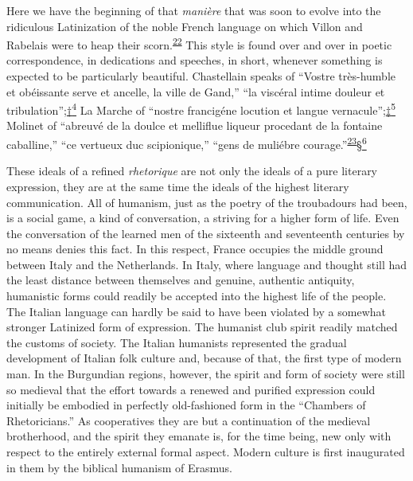 Here we have the beginning of that \emph{manière} that was soon to
evolve into the ridiculous Latinization of the noble French language on
which Villon and Rabelais were to heap their
scorn.\textsuperscript{\protect\hypertarget{22_Chapter_Fourteen__THE_COMING_OF.xhtmlux5cux23id_80}{\protect\hyperlink{23_NOTES.xhtmlux5cux23id_81}{22}}}
This style is found over and over in poetic correspondence, in
dedications and speeches, in short, whenever something is expected to be
particularly beautiful. Chastellain speaks of ``Vostre très-humble et
obéissante serve et ancelle, la ville de Gand,'' ``la viscéral intime
douleur et
tribulation'';\protect\hypertarget{22_Chapter_Fourteen__THE_COMING_OF.xhtmlux5cux23id_2797}{\protect\hyperlink{23_NOTES.xhtmlux5cux23id_2798}{†\textsuperscript{4}}}
La Marche of ``nostre francigéne locution et langue
vernacule'';\protect\hypertarget{22_Chapter_Fourteen__THE_COMING_OF.xhtmlux5cux23id_2795}{\protect\hyperlink{23_NOTES.xhtmlux5cux23id_2796}{‡\textsuperscript{5}}}
Molinet of ``abreuvé de la doulce et melliflue liqueur procedant de la
fontaine caballine,'' ``ce vertueux duc scipionique,'' ``gens de
muliébre
courage.''\textsuperscript{\protect\hypertarget{22_Chapter_Fourteen__THE_COMING_OF.xhtmlux5cux23id_78}{\protect\hyperlink{23_NOTES.xhtmlux5cux23id_79}{23}}}\protect\hypertarget{22_Chapter_Fourteen__THE_COMING_OF.xhtmlux5cux23id_2793}{\protect\hyperlink{23_NOTES.xhtmlux5cux23id_2794}{§\textsuperscript{6}}}

These ideals of a refined \emph{rhetorique} are not only the ideals of a
pure literary expression, they are at the same time the ideals of the
highest literary communication. All of humanism, just as the poetry of
the troubadours had been, is a social game, a kind of conversation, a
striving for a higher form of life. Even the conversation of the learned
men of the sixteenth and seventeenth centuries by no means denies this
fact. In this respect, France occupies the middle ground between Italy
and the Netherlands. In Italy, where
lan\protect\hypertarget{22_Chapter_Fourteen__THE_COMING_OF.xhtmlux5cux23page_389}{}{}guage
and thought still had the least distance between themselves and genuine,
authentic antiquity, humanistic forms could readily be accepted into the
highest life of the people. The Italian language can hardly be said to
have been violated by a somewhat stronger Latinized form of expression.
The humanist club spirit readily matched the customs of society. The
Italian humanists represented the gradual development of Italian folk
culture and, because of that, the first type of modern man. In the
Burgundian regions, however, the spirit and form of society were still
so medieval that the effort towards a renewed and purified expression
could initially be embodied in perfectly old-fashioned form in the
``Chambers of Rhetoricians.'' As cooperatives they are but a
continuation of the medieval brotherhood, and the spirit they emanate
is, for the time being, new only with respect to the entirely external
formal aspect. Modern culture is first inaugurated in them by the
biblical humanism of Erasmus.

